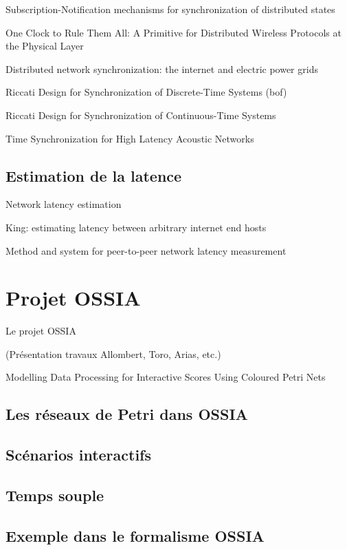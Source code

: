 Subscription-Notification mechanisms for synchronization of distributed states

One Clock to Rule Them All: A Primitive for Distributed Wireless Protocols at the Physical Layer

Distributed network synchronization: the internet and electric power grids

Riccati Design for Synchronization of Discrete-Time Systems (bof)

Riccati Design for Synchronization of Continuous-Time Systems

Time Synchronization for High Latency Acoustic Networks


\subsection{Estimation de la latence}
\label{section:latence}
Network latency estimation %

King: estimating latency between arbitrary internet end hosts

Method and system for peer-to-peer network latency measurement %


\section{Projet OSSIA}
Le projet \ac{OSSIA}

(Présentation travaux Allombert, Toro, Arias, etc.)

Modelling Data Processing for Interactive Scores Using Coloured Petri Nets


\subsection{Les réseaux de Petri dans OSSIA}
\subsection{Scénarios interactifs}
\subsection{Temps souple}
\subsection{Exemple dans le formalisme OSSIA}

